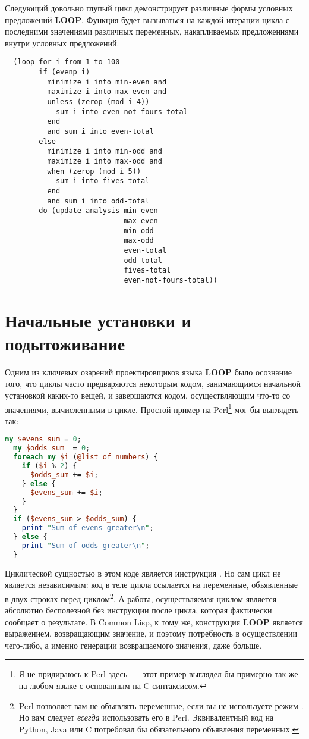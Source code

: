 Следующий довольно глупый цикл демонстрирует различные формы условных предложений
\textbf{LOOP}. Функция  будет вызываться на каждой итерации цикла с
последними значениями различных переменных, накапливаемых предложениями внутри условных
предложений.

\begin{lstlisting}
  (loop for i from 1 to 100
        if (evenp i)
          minimize i into min-even and 
          maximize i into max-even and
          unless (zerop (mod i 4))
            sum i into even-not-fours-total
          end
          and sum i into even-total
        else
          minimize i into min-odd and
          maximize i into max-odd and
          when (zerop (mod i 5)) 
            sum i into fives-total
          end
          and sum i into odd-total
        do (update-analysis min-even
                            max-even
                            min-odd
                            max-odd
                            even-total
                            odd-total
                            fives-total
                            even-not-fours-total))
\end{lstlisting}

\section{Начальные установки и подытоживание}

Одним из ключевых озарений проектировщиков языка \textbf{LOOP} было осознание того, что
циклы часто предваряются некоторым кодом, занимающимся начальной установкой каких-то
вещей, и завершаются кодом, осуществляющим что-то со значениями, вычисленными в
цикле. Простой пример на Perl\footnote{Я не придираюсь к Perl здесь~--- этот пример
  выглядел бы примерно так же на любом языке с основанным на C синтаксисом.} мог бы
выглядеть так:

\begin{lstlisting}[language=Perl]
my $evens_sum = 0;
  my $odds_sum  = 0;
  foreach my $i (@list_of_numbers) {
    if ($i % 2) {
      $odds_sum += $i;
    } else {
      $evens_sum += $i;
    }
  }
  if ($evens_sum > $odds_sum) {
    print "Sum of evens greater\n";
  } else {
    print "Sum of odds greater\n";
  }
\end{lstlisting}

Циклической сущностью в этом коде является инструкция . Но сам цикл
 не является независимым: код в теле цикла ссылается на переменные,
объявленные в двух строках перед циклом\footnote{Perl позволяет вам не объявлять
  переменные, если вы не используете режим . Но вам следует \textit{всегда}
  использовать его в Perl. Эквивалентный код на Python, Java или C потребовал бы
  обязательного объявления переменных.}. А работа, осуществляемая циклом является
абсолютно бесполезной без инструкции  после цикла, которая фактически сообщает о
результате. В Common Lisp, к тому же, конструкция \textbf{LOOP} является выражением,
возвращающим значение, и поэтому потребность в осуществлении чего-либо, а именно генерации
возвращаемого значения, даже больше.

